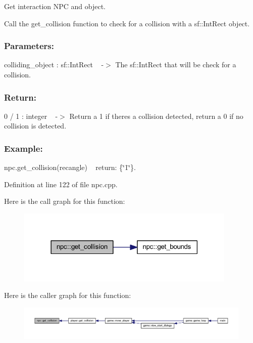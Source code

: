 Get interaction N\+PC and object. 

Call the \textquotesingle{}get\+\_\+collision\textquotesingle{} function to check for a collision with a sf\+::\+Int\+Rect object.~\newline
 \subsubsection*{Parameters\+: }

colliding\+\_\+object \+: sf\+::\+Int\+Rect ~\newline
-\/$>$ The sf\+::\+Int\+Rect that will be check for a collision.~\newline
 \subsubsection*{Return\+: }

0 / 1 \+: integer ~\newline
-\/$>$ Return a 1 if there\textquotesingle{}s a collision detected, return a 0 if no collision is detected.~\newline
 \subsubsection*{Example\+: }

npc.\+get\+\_\+collision(recangle) ~\newline
return\+: \{\char`\"{}1\char`\"{}\}. 

Definition at line 122 of file npc.\+cpp.

Here is the call graph for this function\+:
\nopagebreak
\begin{figure}[H]
\begin{center}
\leavevmode
\includegraphics[width=297pt]{classnpc_a64342e70f2e8c3afde210ffa77e1e54e_cgraph}
\end{center}
\end{figure}
Here is the caller graph for this function\+:
\nopagebreak
\begin{figure}[H]
\begin{center}
\leavevmode
\includegraphics[width=350pt]{classnpc_a64342e70f2e8c3afde210ffa77e1e54e_icgraph}
\end{center}
\end{figure}
\mbox{\label{classnpc_a61315bb51941237b6b2c0fb578f3e5ee}} 
